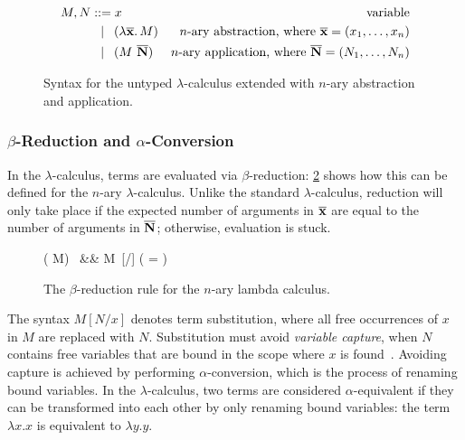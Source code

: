 \documentclass[../../../main.tex]{subfiles}
\begin{document}
\begin{figure}[htb]
\begin{align*}
M, N &\mathrel{::=} x & \text{variable} \\
&\mathrel{\enspace\mid\enspace} (\lambda {\overline{\mathbf{x}}}\ldotp M) & \text{$n$-ary abstraction, where } \overline{\mathbf{x}} = (x_1, \ldots, x_n) \\
&\mathrel{\enspace\mid\enspace} (M\ \overline{\mathbf{N}}) & \text{$n$-ary application, where } \overline{\mathbf{N}} = (N_1, \ldots, N_n)
\end{align*}
\caption{Syntax for the untyped $\lambda$-calculus extended with $n$-ary abstraction and application.}
\label{fig:lambda-calculus}
\end{figure}

\subsubsection{$\beta$-Reduction and $\alpha$-Conversion}
In the $\lambda$-calculus, terms are evaluated via $\beta$-reduction: \cref{fig:beta-reduction} shows how this can be defined for the $n$-ary $\lambda$-calculus.
Unlike the standard $\lambda$-calculus, reduction will only take place if the expected number of arguments in $\overline{\mathbf{x}}$ are equal to the number of arguments in $\overline{\mathbf{N}}$; otherwise, evaluation is stuck.

\begin{figure}[htb]
\begin{lambdacalc}
( M)\  &\betastep& M\ [/] \hspace{3em} ( \lvert {} \rvert = \lvert {} \rvert)
\end{lambdacalc}
\caption{The $\beta$-reduction rule for the $n$-ary lambda calculus.}
\label{fig:beta-reduction}
\end{figure}

\noindent
The syntax $M[N/x]$ denotes term substitution, where all free occurrences of $x$ in $M$ are replaced with $N$.
Substitution must avoid \emph{variable capture}, when $N$ contains free variables that are bound in the scope where $x$ is found~\cite{van-bakel_tsfpl_2022}.
Avoiding capture is achieved by performing $\alpha$-conversion, which is the process of renaming bound variables.
In the $\lambda$-calculus, two terms are considered $\alpha$-equivalent if they can be transformed into each other by only renaming bound variables: the term $\lambda x. x$ is equivalent to $\lambda y. y$.
\end{document}
